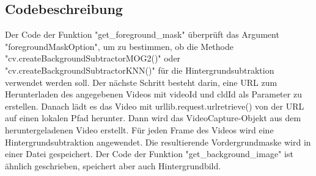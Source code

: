\documentclass[12pt]{scrartcl}
\begin{document}
\subsection{Codebeschreibung}
Der Code der Funktion "get\_foreground\_mask" \"uberpr\"uft das Argument "foregroundMaskOption", um zu bestimmen, ob die Methode "cv.createBackgroundSubtractorMOG2()" oder "cv.createBackgroundSubtractorKNN()" f\"ur die Hintergrundsubtraktion verwendet werden soll. Der n\"achste Schritt besteht darin, eine URL zum Herunterladen des angegebenen Videos mit videoId und cldId als Parameter zu erstellen. Danach l\"adt es das Video mit urllib.request.urlretrieve() von der URL auf einen lokalen Pfad herunter. Dann wird das VideoCapture-Objekt aus dem heruntergeladenen Video erstellt. F\"ur jeden Frame des Videos wird eine Hintergrundsubtraktion angewendet. Die resultierende Vordergrundmaske wird in einer Datei gespeichert.
Der Code der Funktion "get\_background\_image" ist \"ahnlich geschrieben, speichert aber auch Hintergrundbild.\\
\end{document}
